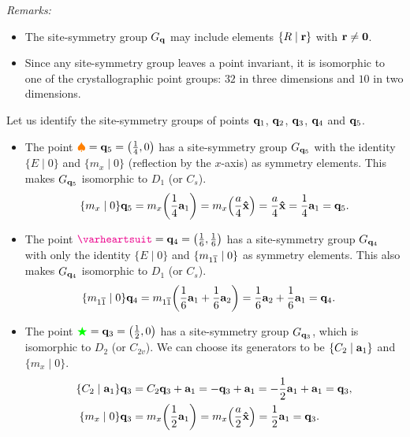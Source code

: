 \textit{Remarks:}
\begin{itemize}
\item The site-symmetry group \( G_{\vb{q}} \) may include elements \(\{R \mid {\vb{r}}\}\) with \({\vb{r}} \neq {\vb{0}}\).
\item Since any site-symmetry group leaves a point invariant, it is isomorphic to one of the crystallographic point groups: $32$ in three dimensions and $10$ in two dimensions.

\end{itemize}

\begin{example} \label{ex:site-symmetry_groups_p6mm}
Let us identify the site-symmetry groups of points ${\vb{q}}_1$, ${\vb{q}}_2$, ${\vb{q}}_3$, ${\vb{q}}_4$ and ${\vb{q}}_5$.

\begin{itemize}
\item The point $\textcolor{orange}{\spadesuit} = {\vb{q}}_5 = \qty(\frac{1}{4}, 0)$ has a site-symmetry group \(G_{{\vb{q}}_5}\) with the identity $\{E \mid 0\}$ and $\{m_{x} \mid 0\}$ (reflection by the $x$-axis) as symmetry elements. This makes $G_{{\vb{q}}_5}$ isomorphic to $D_1$ (or $C_s$).
\begin{equation} \label{eq:site-symmetry-q5}
\{m_{x} \mid 0\} {\vb{q}}_5 = m_x \qty(\frac{1}{4} {\vb{a}}_1) = m_x \qty(\frac{a}{4} \vu{x}) = \frac{a}{4} \vu{x} = \frac{1}{4} {\vb{a}}_1 = {\vb{q}}_5.
\end{equation}


\item The point \(\textcolor{magenta}{\varheartsuit} = \q_4 = \qty(\frac{1}{6}, \frac{1}{6})\) has a site-symmetry group \(G_{{\vb{q}}_4}\) with only the identity $\{E \mid 0\}$ and $\{m_{1\overline{1}} \mid 0\}$ as symmetry elements. This also makes $G_{{\vb{q}}_4}$ isomorphic to $D_1$ (or $C_s$).
\begin{align} \label{eq:site-symmetry-q4}
\{m_{1\overline{1}} \mid 0\} {\vb{q}}_4 &= m_{1\overline{1}}\qty(\frac{1}{6} {\vb{a}}_1 + \frac{1}{6} {\vb{a}}_2) = \frac{1}{6} {\vb{a}}_2 + \frac{1}{6} {\vb{a}}_1 = {\vb{q}}_4.
\end{align}

\item The point \(\textcolor{green}{\bigstar} = {\vb{q}}_3 = \qty(\frac{1}{2}, 0)\) has a site-symmetry group \(G_{{\vb{q}}_3}\), which is isomorphic to \(D_2\) (or $C_{2v}$). We can choose its generators to be $\{C_2 \mid {\vb{a}}_1\}$ and $\{m_{x}\mid 0\}$.
\begin{align} \label{eq:site-symmetry-q3}
\{C_2 \mid {\vb{a}}_1\} {\vb{q}}_3 &= C_2 {\vb{q}}_3 + {\vb{a}}_1 = -{\vb{q}}_3 + {\vb{a}}_1 = -\frac{1}{2} {\vb{a}}_1 + {\vb{a}}_1 = {\vb{q}}_3, \\
\{m_{x} \mid 0\} {\vb{q}}_3 &= m_x \qty(\frac{1}{2} {\vb{a}}_1) = m_x \qty(\frac{a}{2} \vu{x}) = \frac{1}{2} {\vb{a}}_1 = {\vb{q}}_3.
\end{align}


\end{itemize}
\end{example}
